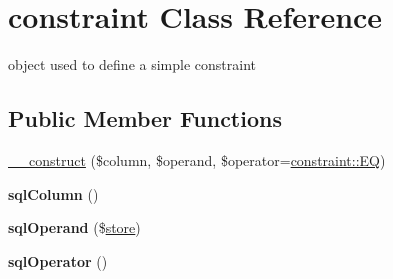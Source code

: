\hypertarget{classconstraint}{}\section{constraint Class Reference}
\label{classconstraint}


object used to define a simple constraint  


\subsection*{Public Member Functions}
\begin{DoxyCompactItemize}
\item 
\hyperlink{classconstraint_a9e4321b5cf73af8119e6ecaac6069bbc}{\+\_\+\+\_\+construct} (\$column, \$operand, \$operator=\hyperlink{classconstraint_ac28f80db55e3b33606f846cf0b2938d5}{constraint\+::\+E\+Q})
\item 
\hypertarget{classconstraint_a0dc612f1698478d40bb6d7f5e89cd690}{}{\bfseries sql\+Column} ()\label{classconstraint_a0dc612f1698478d40bb6d7f5e89cd690}

\item 
\hypertarget{classconstraint_a71d68e9b1fcebe282598a3b678bfb267}{}{\bfseries sql\+Operand} (\$\hyperlink{classstore}{store})\label{classconstraint_a71d68e9b1fcebe282598a3b678bfb267}

\item 
\hypertarget{classconstraint_ae06aa3a7e4d5cc910bc69d38c8234bb9}{}{\bfseries sql\+Operator} ()\label{classconstraint_ae06aa3a7e4d5cc910bc69d38c8234bb9}

\end{DoxyCompactItemize}
